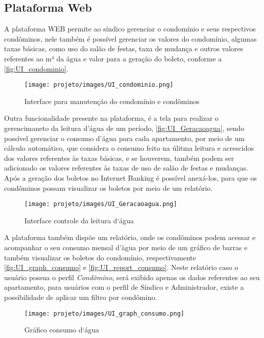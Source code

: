 \documentclass[12pt]{article}
\begin{document}
\subsection{Plataforma Web}
\label{sec:plataforma_web}

A plataforma WEB permite ao síndico gerenciar o condomínio e seus respectivos condôminos, nele também é possível gerenciar os valores do condomínio, algumas taxas básicas, como uso do salão de festas, taxa de mudança e outros valores referentes ao m³ da água e valor para a geração do boleto, conforme a \autoref{fig:UI_condominio}.

\begin{figure}[!ht]
  \centering
  \texttt{[image: projeto/images/UI\_condominio.png]}
  \caption{Interface para manutenção do condomínio e condôminos}
  \label{fig:UI_condominio}
\end{figure}

Outra funcionalidade presente na plataforma, é a tela para realizar o gerencimaneto da leitura d’água de um período, \autoref{fig:UI_Geracaoagua}, sendo possível gerenciar o consumo d’água para cada apartamento, por meio de um cálculo automático, que considera o consumo feito na úlitma leitura e acrescidos dos valores referentes às taxas básicas, e se houverem, também podem ser adicionado os valores referentes às taxas de uso de salão de festas e mudanças. Após a geração dos boletos no Internet Banking é possível anexá-los, para que os condôminos possam visualizar os boletos por meio de um relatório.

\begin{figure}[!ht]
  \centering
  \texttt{[image: projeto/images/UI\_Geracaoagua.png]}
  \caption{Interface controle da leitura d`água}
  \label{fig:UI_Geracaoagua}
\end{figure}

A plataforma também dispõe um relatório, onde os condôminos podem acessar e acompanhar o seu consumo mensal d'àgua por meio de um gráfico de barras e também visualizar os boletos do condomínio, respectivamente \autoref{fig:UI_graph_consumo} e \autoref{fig:UI_report_consumo}. Neste relatório caso o usuário possua o perfil \emph{Condômino}, será exibido apenas os dados referentes ao seu apartamento, para usuários com o perfil de Síndico e Administrador, existe a possibilidade de aplicar um filtro por condômino.

\begin{figure}[!ht]
  \centering
  \texttt{[image: projeto/images/UI\_graph\_consumo.png]}
  \caption{Gráfico consumo d`água}
  \label{fig:UI_graph_consumo}
\end{figure}
\end{document}
